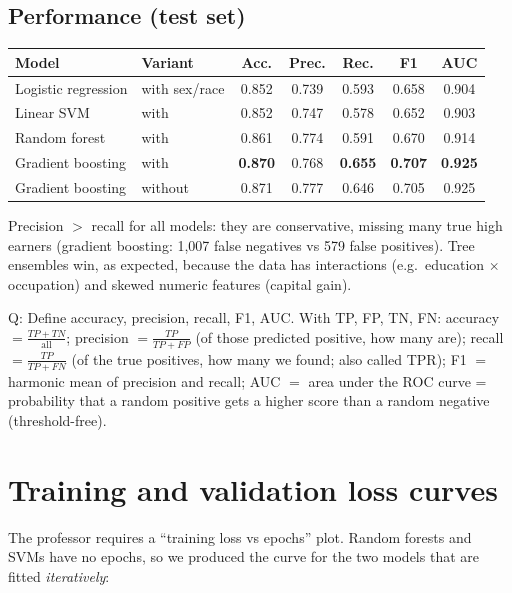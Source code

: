 \documentclass[11pt,a4paper]{article}
\begin{document}
\subsection{Performance (test set)}
\begin{center}\small
\begin{tabular}{llccccc}
\toprule
Model & Variant & Acc. & Prec. & Rec. & F1 & AUC \\
\midrule
Logistic regression & with sex/race & 0.852 & 0.739 & 0.593 & 0.658 & 0.904 \\
Linear SVM & with & 0.852 & 0.747 & 0.578 & 0.652 & 0.903 \\
Random forest & with & 0.861 & 0.774 & 0.591 & 0.670 & 0.914 \\
Gradient boosting & with & \textbf{0.870} & 0.768 & \textbf{0.655} & \textbf{0.707} & \textbf{0.925} \\
Gradient boosting & without & 0.871 & 0.777 & 0.646 & 0.705 & 0.925 \\
\bottomrule
\end{tabular}
\end{center}
Precision $>$ recall for all models: they are conservative, missing many true high earners (gradient boosting: 1,007 false negatives vs 579 false positives). Tree ensembles win, as expected, because the data has interactions (e.g.\ education $\times$ occupation) and skewed numeric features (capital gain).

\begin{qa}{Q: Define accuracy, precision, recall, F1, AUC.}
With TP, FP, TN, FN: accuracy $=\frac{TP+TN}{\text{all}}$; precision $=\frac{TP}{TP+FP}$ (of those predicted positive, how many are); recall $=\frac{TP}{TP+FN}$ (of the true positives, how many we found; also called TPR); F1 $=$ harmonic mean of precision and recall; AUC $=$ area under the ROC curve = probability that a random positive gets a higher score than a random negative (threshold-free).
\end{qa}

\section{Training and validation loss curves}

The professor requires a ``training loss vs epochs'' plot. Random forests and SVMs have no epochs, so we produced the curve for the two models that are fitted \emph{iteratively}:
\end{document}

